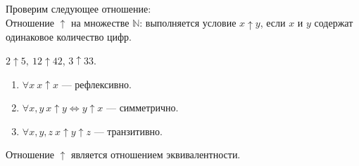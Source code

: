 \documentclass[russian]{lecture-notes}
\begin{document}
	Проверим следующее отношение:\\
	Отношение $\uparrow$ на множестве $\mathbb{N}$: выполняется условие $x \uparrow y$, если $x$ и $y$ содержат одинаковое количество цифр.
	\begin{example}
		$2 \uparrow 5,~12 \uparrow 42$, \sout{$3 \uparrow 33$}.
	\end{example}
	\begin{enumerate}
		\item $\forall x~x \uparrow x$ --- рефлексивно.
		\item $\forall x,y~x \uparrow y \Leftrightarrow y \uparrow x$ --- симметрично.
		\item $\forall x,y,z~x \uparrow y \uparrow z$ --- транзитивно.
	\end{enumerate}
	Отношение $\uparrow$ является отношением эквивалентности.
	
\end{document}
